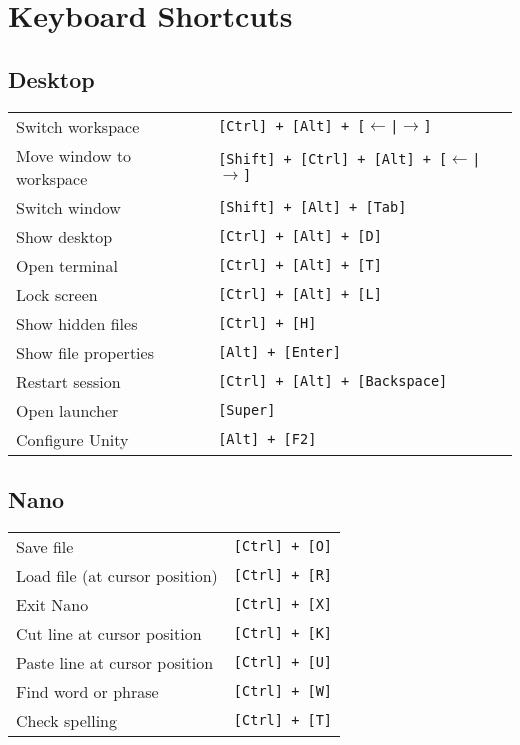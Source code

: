 %

\section{Keyboard Shortcuts}
\subsection{Desktop}
\settowidth{\MyLen}{Move window to workspace~~}
\begin{tabular}{@{}p{\the\MyLen}%
				@{}p{\linewidth-\the\MyLen}}
	Switch workspace			& \texttt{[Ctrl] + [Alt] + [$\leftarrow$|$\rightarrow$]} \\
	Move window to workspace	& \texttt{[Shift] + [Ctrl] + [Alt] + [$\leftarrow$|$\rightarrow$]} \\
	Switch window				& \texttt{[Shift] + [Alt] + [Tab]} \\
	Show desktop				& \texttt{[Ctrl] + [Alt] + [D]} \\
	Open terminal				& \texttt{[Ctrl] + [Alt] + [T]} \\
	Lock screen					& \texttt{[Ctrl] + [Alt] + [L]} \\
	Show hidden files			& \texttt{[Ctrl] + [H]} \\
	Show file properties		& \texttt{[Alt] + [Enter]} \\
	Restart session				& \texttt{[Ctrl] + [Alt] + [Backspace]} \\
	Open launcher				& \texttt{[Super]} \\
	Configure Unity				& \texttt{[Alt] + [F2]}\\
\end{tabular}

\subsection{Nano}
\settowidth{\MyLen}{Load file (at cursor position)~~}
\begin{tabular}{@{}p{\the\MyLen}%
				@{}p{\linewidth-\the\MyLen}}
	Save file						& \texttt{[Ctrl] + [O]} \\
	Load file (at cursor position)	& \texttt{[Ctrl] + [R]} \\
	Exit Nano						& \texttt{[Ctrl] + [X]} \\
	Cut line at cursor position		& \texttt{[Ctrl] + [K]} \\
	Paste line at cursor position	& \texttt{[Ctrl] + [U]} \\
	Find word or phrase				& \texttt{[Ctrl] + [W]} \\
	Check spelling					& \texttt{[Ctrl] + [T]} \\
\end{tabular}


